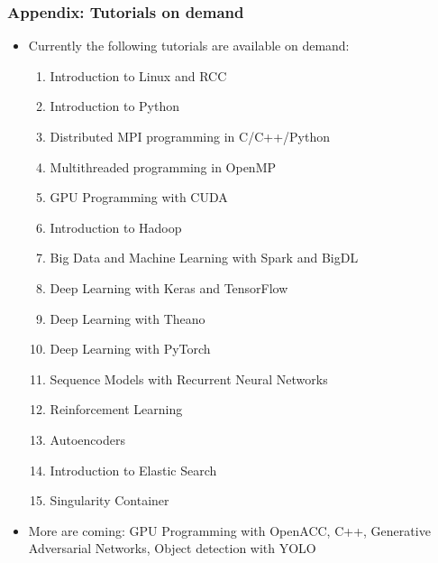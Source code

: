 \begin{frame}[fragile]
  \frametitle{Appendix: Tutorials on demand}
  \begin{itemize}
    \item Currently the following tutorials are available on demand:
      \begin{enumerate}
        \item Introduction to Linux and RCC
        \item Introduction to Python
        \item Distributed MPI programming in C/C++/Python
        \item Multithreaded programming in OpenMP
        \item GPU Programming with CUDA
        \item Introduction to Hadoop
        \item Big Data and Machine Learning with Spark and BigDL
        \item Deep Learning with Keras and TensorFlow
        \item Deep Learning with Theano
        \item Deep Learning with PyTorch
        \item Sequence Models with Recurrent Neural Networks
        \item Reinforcement Learning
        \item Autoencoders
        \item Introduction to Elastic Search
        \item Singularity Container
        \end{enumerate}
      \item More are coming: GPU Programming with OpenACC, C++, Generative Adversarial Networks,
        Object detection with YOLO
  \end{itemize}
\end{frame}

